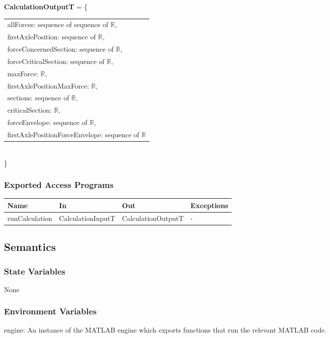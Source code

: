 \documentclass[12pt, titlepage]{article}
\begin{document}
\noindent \textbf{CalculationOutputT} = \{\\
    \begin{tabular}{l}
    \noindent allForces: sequence of sequence of $\mathbb{R}$,\\

	\noindent firstAxlePosition: sequence of $\mathbb{R}$,\\

	\noindent forceConcernedSection: sequence of $\mathbb{R}$,\\
	\noindent forceCriticalSection: sequence of $\mathbb{R}$,\\

	\noindent maxForce: $\mathbb{R}$,\\
	\noindent firstAxlePositionMaxForce: $\mathbb{R}$,\\

    \noindent sections: sequence of $\mathbb{R}$,\\
    \noindent criticalSection: $\mathbb{R}$,\\

	\noindent forceEnvelope: sequence of $\mathbb{R}$,\\
	\noindent firstAxlePositionForceEnvelope: sequence of $\mathbb{R}$
 \end{tabular}
\\\}

\subsubsection{Exported Access Programs}
\begin{center}
\begin{tabular}{p{3cm} p{4cm} p{4cm} p{3cm}}
\hline
\textbf{Name} & \textbf{In} & \textbf{Out} & \textbf{Exceptions} \\
\hline
runCalculation & CalculationInputT & CalculationOutputT & - \\
\hline
\end{tabular}
\end{center}

\subsection{Semantics}

\subsubsection{State Variables}
None
\subsubsection{Environment Variables}
engine: An instance of the MATLAB engine which exports functions that run the relevant MATLAB code.
\end{document}
